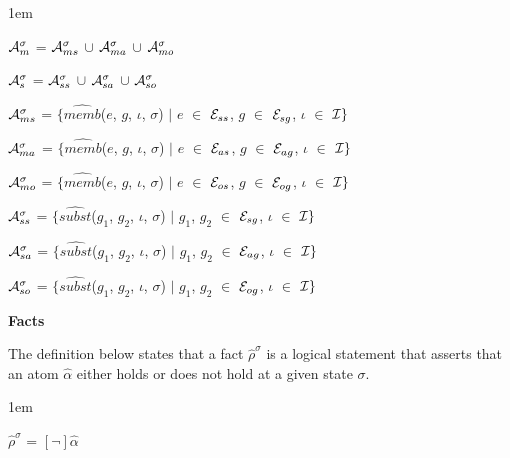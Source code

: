 \documentclass[11pt]{report}
\newenvironment{vquote}
{
  \begin{list}{}{\leftmargin 1em}\item[]
}
{
  \end{list}
}
\begin{document}
\begin{itemize}
\begin{vquote}
                ${\cal A}^{\sigma}_{m}$ =
                  ${\cal A}^{\sigma}_{ms}$ $\cup$
                  ${\cal A}^{\sigma}_{ma}$ $\cup$
                  ${\cal A}^{\sigma}_{mo}$

                ${\cal A}^{\sigma}_{s}$ =
                  ${\cal A}^{\sigma}_{ss}$ $\cup$
                  ${\cal A}^{\sigma}_{sa}$ $\cup$
                  ${\cal A}^{\sigma}_{so}$

                ${\cal A}^{\sigma}_{ms}$ =
                  $\{\hat{memb}$($e$, $g$, $\iota$, $\sigma$) $\mid$
                  $e$ $\in$ ${\cal E}_{ss}$,
                  $g$ $\in$ ${\cal E}_{sg}$,
                  $\iota$ $\in$ ${\cal I}\}$

                ${\cal A}^{\sigma}_{ma}$ =
                  $\{\hat{memb}$($e$, $g$, $\iota$, $\sigma$) $\mid$
                  $e$ $\in$ ${\cal E}_{as}$,
                  $g$ $\in$ ${\cal E}_{ag}$,
                  $\iota$ $\in$ ${\cal I}\}$

                ${\cal A}^{\sigma}_{mo}$ =
                  $\{\hat{memb}$($e$, $g$, $\iota$, $\sigma$) $\mid$
                  $e$ $\in$ ${\cal E}_{os}$,
                  $g$ $\in$ ${\cal E}_{og}$,
                  $\iota$ $\in$ ${\cal I}\}$

                ${\cal A}^{\sigma}_{ss}$ =
                  $\{\hat{subst}$($g_{1}$, $g_{2}$, $\iota$, $\sigma$) $\mid$
                  $g_{1}$, $g_{2}$ $\in$ ${\cal E}_{sg}$,
                  $\iota$ $\in$ ${\cal I}\}$

                ${\cal A}^{\sigma}_{sa}$ =
                  $\{\hat{subst}$($g_{1}$, $g_{2}$, $\iota$, $\sigma$) $\mid$
                  $g_{1}$, $g_{2}$ $\in$ ${\cal E}_{ag}$,
                  $\iota$ $\in$ ${\cal I}\}$

                ${\cal A}^{\sigma}_{so}$ =
                  $\{\hat{subst}$($g_{1}$, $g_{2}$, $\iota$, $\sigma$) $\mid$
                  $g_{1}$, $g_{2}$ $\in$ ${\cal E}_{og}$,
                  $\iota$ $\in$ ${\cal I}\}$
              \end{vquote}

            \item
              {\bf Facts}

              The definition below states that a fact $\hat{\rho}^\sigma$ is a
              logical statement that asserts that an atom $\hat{\alpha}$ either
              holds or does not hold at a given state $\sigma$.

              \begin{vquote}
                $\hat{\rho}^{\sigma}$ =
                  $[\lnot]$$\hat{\alpha}$


\end{vquote}
\end{itemize}
\end{document}
